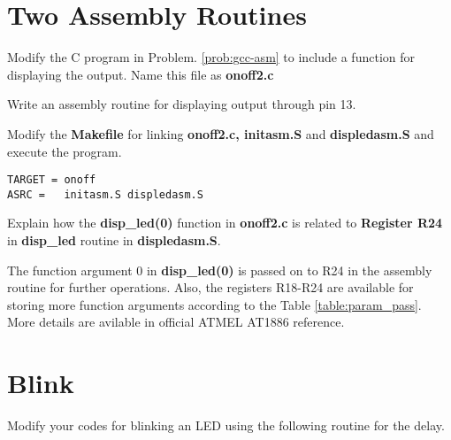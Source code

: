 \documentclass[journal,12pt,twocolumn]{IEEEtran}
\begin{document}
\section{Two Assembly Routines}
\begin{problem}
Modify the C program in Problem. \ref{prob:gcc-asm} to include a function for displaying the output.  Name this file as \textbf{onoff2.c}
\end{problem}
\solution

\begin{problem}
Write an assembly routine for displaying output through pin 13.
\end{problem}
\solution

\begin{problem}
Modify the \textbf{Makefile} for linking \textbf{onoff2.c, initasm.S} and  \textbf{displedasm.S} and execute the program.
\end{problem}
\solution
\begin{lstlisting}
TARGET = onoff
ASRC =   initasm.S displedasm.S
\end{lstlisting}
%
\begin{problem}
Explain how the \textbf{disp\_led(0)} function in \textbf{onoff2.c} is related to \textbf{Register R24} in \textbf{disp\_led} routine in \textbf{displedasm.S}.
\end{problem}
\solution The function argument 0 in \textbf{disp\_led(0)} is passed on to R24 in the assembly routine for further operations.  Also, the registers R18-R24 are available for storing more function arguments according to the Table \ref{table:param_pass}.  More details are avilable in official ATMEL AT1886 reference.

\section{Blink}
\begin{problem}
Modify your codes for blinking an LED using the following routine for the delay.
\end{problem}

\end{document}
